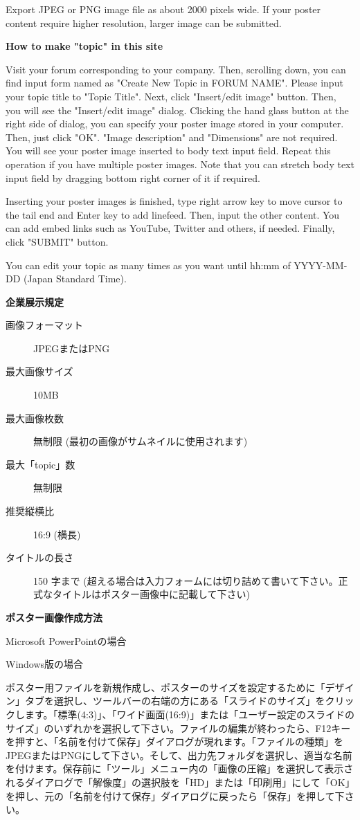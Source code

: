 \documentclass[titlepage,10pt,a4paper,uplatex]{jsbook}
\newenvironment{content}{\begin{shaded}\vspace{-1em}\raggedright\ttfamily\footnotesize\setlength{\baselineskip}{1.4em}}{\end{shaded}\vspace{-1em}}
\renewcommand{\textbf}[1]{{\bfseries\sffamily#1}}
\begin{document}
\begin{content}
Export JPEG or PNG image file as about 2000 pixels wide. If your poster content require higher resolution, larger image can be submitted.

\textbf{\Large How to make "topic" in this site}

Visit your forum corresponding to your company. Then, scrolling down, you can find input form named as "Create New Topic in FORUM NAME". Please input your topic title to "Topic Title". Next, click "Insert/edit image" button. Then, you will see the "Insert/edit image" dialog. Clicking the hand glass button at the right side of dialog, you can specify your poster image stored in your computer. Then, just click "OK". "Image description" and "Dimensions" are not required. You will see your poster image inserted to body text input field. Repeat this operation if you have multiple poster images. Note that you can stretch body text input field by dragging bottom right corner of it if required.

Inserting your poster images is finished, type right arrow key to move cursor to the tail end and Enter key to add linefeed. Then, input the other content. You can add embed links such as YouTube, Twitter and others, if needed. Finally, click "SUBMIT" button.

You can edit your topic as many times as you want until hh:mm of YYYY-MM-DD (Japan Standard Time).

\textbf{\Large 企業展示規定}

\begin{description}
\item[画像フォーマット] JPEGまたはPNG
\item[最大画像サイズ] 10MB
\item[最大画像枚数] 無制限 (最初の画像がサムネイルに使用されます)
\item[最大「topic」数] 無制限
\item[推奨縦横比] 16:9 (横長)
\item[タイトルの長さ] 150 字まで (超える場合は入力フォームには切り詰めて書いて下さい。正式なタイトルはポスター画像中に記載して下さい)
\end{description}

\textbf{\Large ポスター画像作成方法}

{\Large Microsoft PowerPointの場合}

{\large Windows版の場合}

ポスター用ファイルを新規作成し、ポスターのサイズを設定するために「デザイン」タブを選択し、ツールバーの右端の方にある「スライドのサイズ」をクリックします。「標準(4:3)」、「ワイド画面(16:9)」または「ユーザー設定のスライドのサイズ」のいずれかを選択して下さい。ファイルの編集が終わったら、F12キーを押すと、「名前を付けて保存」ダイアログが現れます。「ファイルの種類」をJPEGまたはPNGにして下さい。そして、出力先フォルダを選択し、適当な名前を付けます。保存前に「ツール」メニュー内の「画像の圧縮」を選択して表示されるダイアログで「解像度」の選択肢を「HD」または「印刷用」にして「OK」を押し、元の「名前を付けて保存」ダイアログに戻ったら「保存」を押して下さい。


\end{content}
\end{document}
